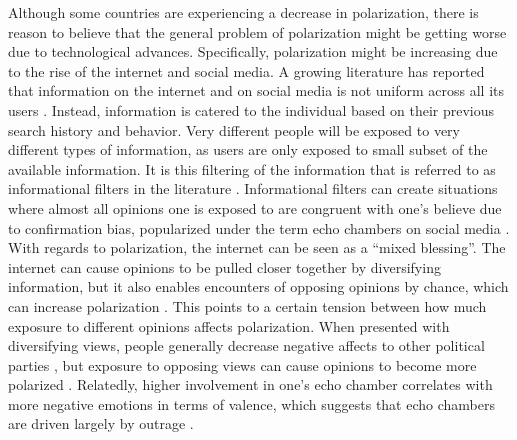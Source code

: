 \documentclass{article}
\begin{document}
Although some countries are experiencing a decrease in polarization, there is reason to believe that the general problem of polarization might be getting worse due to technological advances.
Specifically, polarization might be increasing due to the rise of the internet and social media. A growing literature has reported that information on the internet and on social media is not uniform across all its users \cite{taylor_exploring_2018, sasahara_social_2021,baumann_modeling_2020,tsai_echo_2020}. Instead, information is catered to the individual based on their previous search history and behavior. Very different people will be exposed to very different types of information, as users are only exposed to small subset of the available information. It is this filtering of the information that is referred to as informational filters in the literature \cite{geschke2019triple}.
Informational filters can create situations where almost all opinions one is exposed to are congruent with one’s believe due to confirmation bias, popularized under the term echo chambers on social media \cite{baumann_modeling_2020, sasahara_social_2021, tsai_echo_2020, geschke2019triple}. With regards to polarization, the internet can be seen as a “mixed blessing”. The internet can cause opinions to be pulled closer together by diversifying information, but it also enables encounters of opposing opinions by chance, which can increase polarization \cite{lev-on_happy_2009}.
This points to a certain tension between how much exposure to different opinions affects polarization. When presented with diversifying views, people generally decrease negative affects to other political parties \cite{levy_social_2021}, but exposure to opposing views can cause opinions to become more polarized \cite{bail_exposure_2018}. 
Relatedly, higher involvement in one’s echo chamber correlates with more negative emotions in terms of valence, which suggests that echo chambers are driven largely by outrage \cite{del_vicario_echo_2016}. 
\end{document}

